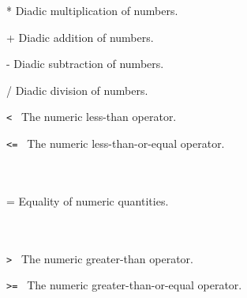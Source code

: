 
\begin{okbcfspec}{*}
Diadic multiplication of numbers.\\
\end{okbcfspec}

\begin{okbcfspec}{+}
Diadic addition of numbers.\\
\end{okbcfspec}

\begin{okbcfspec}{-}
Diadic subtraction of numbers.\\
\end{okbcfspec}

\begin{okbcfspec}{/}
Diadic division of numbers.\\
\end{okbcfspec}

\begin{okbcfspec}{{\tt < }}
The numeric less-than operator.\\
\end{okbcfspec}

\begin{okbcfspec}{{\tt <= }}
The numeric less-than-or-equal operator.\\
\\
\\
\end{okbcfspec}

\begin{okbcfspec}{=}
Equality of numeric quantities.\\
\\
\\
\end{okbcfspec}

\begin{okbcfspec}{{\tt > }}
The numeric greater-than operator.\\
\end{okbcfspec}

\begin{okbcfspec}{{\tt >= }}
The numeric greater-than-or-equal operator.\\
\\
\\
\end{okbcfspec}


